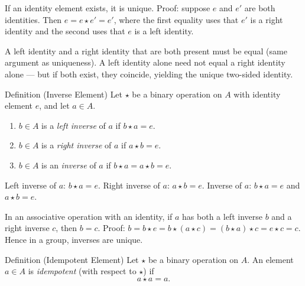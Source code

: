 \begin{remark}
If an identity element exists, it is unique.
Proof: suppose $e$ and $e'$ are both identities.
Then $e = e \star e' = e'$, where the first equality uses that $e'$ is a
right identity and the second uses that $e$ is a left identity.
\end{remark}

\begin{remark}
A left identity and a right identity that are both present must be equal
(same argument as uniqueness).
A left identity alone need not equal a right identity alone —
but if both exist, they coincide, yielding the unique two-sided identity.
\end{remark}

\begin{definitionbox}{Definition (Inverse Element)}
\label{def:inverse-element}
Let $\star$ be a binary operation on $A$ with identity element $e$,
and let $a \in A$.
\begin{enumerate}[label=(\roman*)]
  \item $b \in A$ is a \emph{left inverse} of $a$ if
        $b \star a = e$.
  \item $b \in A$ is a \emph{right inverse} of $a$ if
        $a \star b = e$.
  \item $b \in A$ is an \emph{inverse} of $a$ if
        $b \star a = a \star b = e$.
\end{enumerate}
\end{definitionbox}

\begin{remark}
Left inverse of $a$: $b \star a = e$.
Right inverse of $a$: $a \star b = e$.
Inverse of $a$: $b \star a = e$ and $a \star b = e$.
\end{remark}

\begin{remark}
In an associative operation with an identity, if $a$ has both a left
inverse $b$ and a right inverse $c$, then $b = c$.
Proof: $b = b \star e = b \star (a \star c) = (b \star a) \star c = e \star c = c$.
Hence in a group, inverses are unique.
\end{remark}

\begin{definitionbox}{Definition (Idempotent Element)}
\label{def:idempotent-element}
Let $\star$ be a binary operation on $A$.
An element $a \in A$ is \emph{idempotent} (with respect to $\star$) if
\[
  a \star a = a.
\]
\end{definitionbox}

